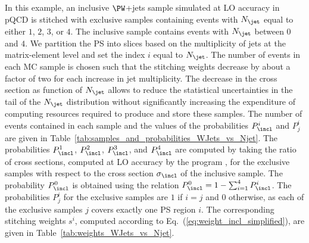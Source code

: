 In this example, an inclusive $\PW$+jets sample simulated at LO accuracy in pQCD 
is stitched with exclusive samples containing events with $N_{\jet}$ equal to either $1$, $2$, $3$, or $4$.
The inclusive sample contains events with $N_{\jet}$ between $0$ and $4$.
We partition the PS into slices based on the multiplicity of jets at the matrix-element level and set the index $i$ equal to $N_{\jet}$.
The number of events in each MC sample is chosen such that the stitching weights decrease by about a factor of two for each increase in jet multiplicity.
The decrease in the cross section as function of $N_{\jet}$
allows to reduce the statistical uncertainties in the tail of the $N_{\jet}$ distribution
without significantly increasing the expenditure of computing resources required to produce and store these samples.
The number of events contained in each sample and the values of the probabilities $P_{\incl}^{i}$ and $P_{j}^{i}$ are given in Table~\ref{tab:samples_and_probabilities_WJets_vs_Njet}.
The probabilities $P_{\incl}^{1}$, $P_{\incl}^{2}$, $P_{\incl}^{3}$, and $P_{\incl}^{4}$ are computed by taking the ratio of cross sections,
computed at LO accuracy by the program \MGvATNLO,
for the exclusive samples with respect to the cross section $\sigma_{\incl}$ of the inclusive sample.
The probability $P_{\incl}^{0}$ is obtained using the relation $P_{\incl}^{0} = 1 - \sum_{i=1}^{4} P_{\incl}^{i}$.
The probabilities $P_{j}^{i}$ for the exclusive samples are $1$ if $i=j$ and $0$ otherwise,
as each of the exclusive samples $j$ covers exactly one PS region $i$.
The corresponding stitching weights $s^{i}$, computed according to Eq.~(\ref{eq:weight_incl_simplified}), are given in Table~\ref{tab:weights_WJets_vs_Njet}.

